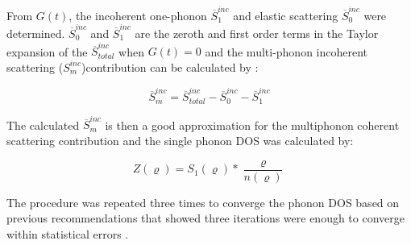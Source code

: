 \noindent From $G(t)$, the incoherent one-phonon $\overline{S}_{1}^{inc}$ and elastic scattering $\overline{S}_{0}^{inc}$ were determined.  $\overline{S}_{0}^{inc}$ and $\overline{S}_{1}^{inc}$ are the zeroth and first order terms in the Taylor expansion of the $\overline{S}_{total}^{inc}$ when $G(t)=0$ and the multi-phonon incoherent scattering ($S_{m}^{inc}$)contribution can be calculated by \cite{Manley2001,Manley2002}:

\begin{equation}
\label{eq: S_inco}
\overline{S}_{m}^{inc} = \overline{S}_{total}^{inc}-\overline{S}_{0}^{inc}-\overline{S}_{1}^{inc}
\end{equation}

\noindent The calculated $\overline{S}_{m}^{inc}$ is then a good approximation for the multiphonon coherent scattering contribution and the single phonon DOS was calculated by:

\begin{equation}
\label{eq: onephonon}
Z(\varrho) = S_{1}(\varrho)* \frac{\varrho}{n(\varrho)}
\end{equation}

\noindent The procedure was repeated three times to converge the phonon DOS based on previous recommendations that showed three iterations were enough to converge within statistical errors \cite{Manley2001,Manley2002}.